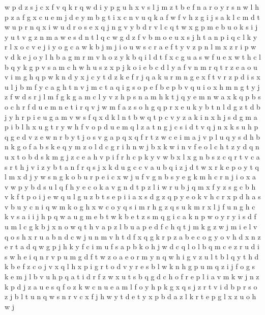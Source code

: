 \documentclass{article}
\begin{document}
w
p d z s j c x f v q k r
q w d i y p g u h x v s l j m z t b e f n a r
o y r s n w l h p z a f g x c u e m
j d e y m b g t i x c n v u q k a f w
f v h z g i j s a k l c m d t w u p r n q x
i w u d r o s e x q j n g v y b
d r v l c q t w x g p m e b u o k s i j y
u t v g z n m a w e s d
n t l q c
w g d z f v b m o e u x s j h t a n p i q c l k y r
l x o
c v e j i
y o g c a w k b j m
j i o u w s c r a e f t y v z p n l m
x z r i p w v d k e j o y l h b a g m
r m v h o z y k b q i l d t f x c g u a s w
f u e x w t h c l b q y k g p v s a m
c h w
h u s z x p j k o i e b c d l y a f v n m r q t
r z e a o u v i m g h q p w k n d y x j c
y t d z k e f r j q a
k u r m n g e x f t v
r z p d i s x u l j b m f y c a g h t n v
j m c t a q i g s o p e f b
e p b v q u i o x h m n g t y j z f w d s
r j l m f g
k g a m c l y v z h
p s n a m h k t j q y e
m n w a x k q p b s o c h r f d u e
m n e t i r q
v j w m f a z s o h g q p r x e u k y b t n l d
g z t d
b j y h r p i e u g a m v w s f q x d k l n t
b w q t p c v y z a k i n x h j s d g m
a p i b l h x u g t
r y w h f v o p d u e m q l z a t n g j c s i
d t v q
j n x k s u h p q g e d v
z e w n r b y t j o s v g a p q x
q f
r t z w c e i m a j v p l u q y s d h b n k g o f
a b s k e q y m z o l d c g r i h n w j
b x k w i n v f e o l c h t z y d
q n u x t o b d s k m g j z c e a h v p
i f r h c p k y v w b x l
x g n b s z c q
r t v c a
s r t h j
v i z y b t a n f r q s j x k d u g c
c v a u b q i z j d t w x r k e p o y
t q l m x d j y w s n g k o b u r p e i c
x w j u f v g n b s y
e g k m h c r n j i o x a v w p y b d s u l q f
h y e c o k a v g n d t p z l i w r u b j q m x f
y z s g c b h v k f t p o i j e w q u
l g u z b t s e p i
i a x s d g z q p y e o k v h c r
x p d h
a s v b u y c n i q w m k o g h x
w c o y q s i m
r h g z q s u k m
r x l j f u n g h c k v s a i
i j h p q w a u g m e
b t w k
b e t z s m q g i c a k n p w o y
r y i s d f u m l c g k b j x n o w q t h v a p z
l b u a p e d f c h q t j m
k g z w j m i e l v q o s h x r u a b n d c
w j u n m v h t d f x q g k r p z a b e c o
g y o v h d
x n z e r t a d q w g p j h k y f c i m u
f s a p b k o h j w d c q l
o l b q m c e z r u d i s w h
e i q n r v p u m g d f t w z o
a e o r m y n q w h i g v z u l t b
l q y t h d k b e f z c o j v x
q
l
h x p i g r
t o d v y r e s b l w k n h g p u m q z i j f
o g s k e m j l b v u h p q a t i d r f z w x
u t s b q g d c h o f r e p l i a v m k w j n z
k p d j z
a u e s q f o z k
w c n u e a m l f o y h p k g x q s j z r t v i d b
p r s o z j b l t u n q w
s n r v c x f j h w y t d
e t y x p
b d a z l k
r t e p g l x z u o h w j
\end{document}
